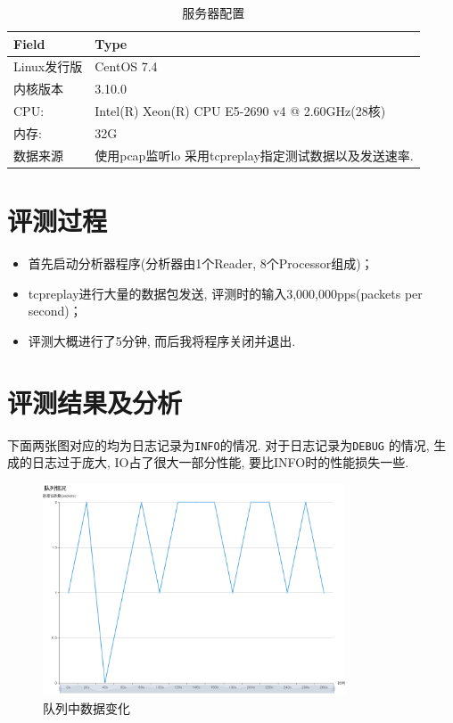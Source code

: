 \begin{table}[]
    \centering
    \caption{服务器配置}
    \label{tbl:server_config}
    \begin{tabular}{ll} \hline
    Field    & Type          \\ \hline
    Linux发行版 & CentOS 7.4 \\
    内核版本   &   3.10.0 \\
    CPU:     & Intel(R) Xeon(R) CPU E5-2690 v4 @ 2.60GHz(28核) \\
    内存:    & 32G                                       \\
    数据来源 & 使用pcap监听lo 采用tcpreplay指定测试数据以及发送速率. \\ \hline
    \end{tabular}
\end{table}


\section{评测过程}

\begin{itemize}
    \item 首先启动分析器程序(分析器由1个Reader, 8个Processor组成)；
    \item tcpreplay进行大量的数据包发送, 评测时的输入3,000,000pps(packets per second)；
    \item 评测大概进行了5分钟, 而后我将程序关闭并退出.
\end{itemize}

\section{评测结果及分析}

 下面两张图对应的均为日志记录为\texttt{INFO}的情况. 对于日志记录为\texttt{DEBUG}
的情况, 生成的日志过于庞大, IO占了很大一部分性能, 要比INFO时的性能损失一些.

\begin{figure}[htbp!]
  \centering
  \includegraphics[width=0.8\textwidth]{../img/队列情况-line.png}
  \caption{队列中数据变化}
  \label{fig:queue_pic}
\end{figure}

